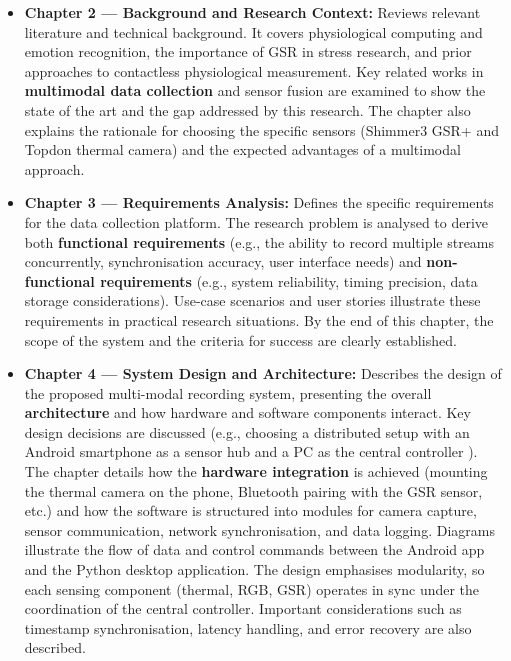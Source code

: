 \begin{itemize}
  \item \textbf{Chapter 2 --- Background and Research Context:} Reviews relevant literature and technical background. It covers physiological computing and emotion recognition, the importance of GSR in stress research, and prior approaches to contactless physiological measurement. Key related works in \textbf{multimodal data collection} and sensor fusion are examined to show the state of the art and the gap addressed by this research. The chapter also explains the rationale for choosing the specific sensors (Shimmer3 GSR+ and Topdon thermal camera) and the expected advantages of a multimodal approach.
  \item \textbf{Chapter 3 --- Requirements Analysis:} Defines the specific requirements for the data collection platform. The research problem is analysed to derive both \textbf{functional requirements} (e.g., the ability to record multiple streams concurrently, synchronisation accuracy, user interface needs) and \textbf{non-functional requirements} (e.g., system reliability, timing precision, data storage considerations). Use-case scenarios and user stories illustrate these requirements in practical research situations. By the end of this chapter, the scope of the system and the criteria for success are clearly established.
  \item \textbf{Chapter 4 --- System Design and Architecture:} Describes the design of the proposed multi-modal recording system, presenting the overall \textbf{architecture} and how hardware and software components interact. Key design decisions are discussed (e.g., choosing a distributed setup with an Android smartphone as a sensor hub and a PC as the central controller \citep{ref9}). The chapter details how the \textbf{hardware integration} is achieved (mounting the thermal camera on the phone, Bluetooth pairing with the GSR sensor, etc.) and how the software is structured into modules for camera capture, sensor communication, network synchronisation, and data logging. Diagrams illustrate the flow of data and control commands between the Android app and the Python desktop application. The design emphasises modularity, so each sensing component (thermal, RGB, GSR) operates in sync under the coordination of the central controller. Important considerations such as timestamp synchronisation, latency handling, and error recovery are also described.

\end{itemize}
